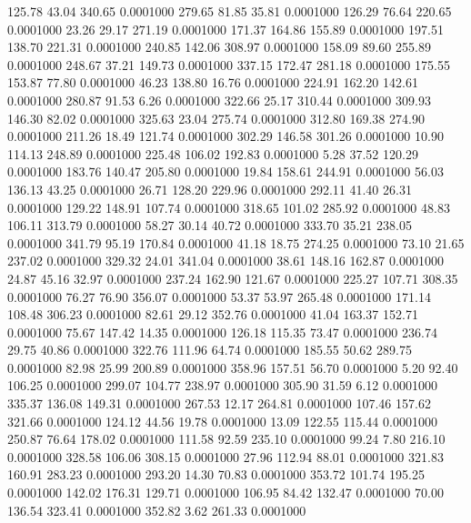  125.78   43.04  340.65   0.0001000
 279.65   81.85   35.81   0.0001000
 126.29   76.64  220.65   0.0001000
  23.26   29.17  271.19   0.0001000
 171.37  164.86  155.89   0.0001000
 197.51  138.70  221.31   0.0001000
 240.85  142.06  308.97   0.0001000
 158.09   89.60  255.89   0.0001000
 248.67   37.21  149.73   0.0001000
 337.15  172.47  281.18   0.0001000
 175.55  153.87   77.80   0.0001000
  46.23  138.80   16.76   0.0001000
 224.91  162.20  142.61   0.0001000
 280.87   91.53    6.26   0.0001000
 322.66   25.17  310.44   0.0001000
 309.93  146.30   82.02   0.0001000
 325.63   23.04  275.74   0.0001000
 312.80  169.38  274.90   0.0001000
 211.26   18.49  121.74   0.0001000
 302.29  146.58  301.26   0.0001000
  10.90  114.13  248.89   0.0001000
 225.48  106.02  192.83   0.0001000
   5.28   37.52  120.29   0.0001000
 183.76  140.47  205.80   0.0001000
  19.84  158.61  244.91   0.0001000
  56.03  136.13   43.25   0.0001000
  26.71  128.20  229.96   0.0001000
 292.11   41.40   26.31   0.0001000
 129.22  148.91  107.74   0.0001000
 318.65  101.02  285.92   0.0001000
  48.83  106.11  313.79   0.0001000
  58.27   30.14   40.72   0.0001000
 333.70   35.21  238.05   0.0001000
 341.79   95.19  170.84   0.0001000
  41.18   18.75  274.25   0.0001000
  73.10   21.65  237.02   0.0001000
 329.32   24.01  341.04   0.0001000
  38.61  148.16  162.87   0.0001000
  24.87   45.16   32.97   0.0001000
 237.24  162.90  121.67   0.0001000
 225.27  107.71  308.35   0.0001000
  76.27   76.90  356.07   0.0001000
  53.37   53.97  265.48   0.0001000
 171.14  108.48  306.23   0.0001000
  82.61   29.12  352.76   0.0001000
  41.04  163.37  152.71   0.0001000
  75.67  147.42   14.35   0.0001000
 126.18  115.35   73.47   0.0001000
 236.74   29.75   40.86   0.0001000
 322.76  111.96   64.74   0.0001000
 185.55   50.62  289.75   0.0001000
  82.98   25.99  200.89   0.0001000
 358.96  157.51   56.70   0.0001000
   5.20   92.40  106.25   0.0001000
 299.07  104.77  238.97   0.0001000
 305.90   31.59    6.12   0.0001000
 335.37  136.08  149.31   0.0001000
 267.53   12.17  264.81   0.0001000
 107.46  157.62  321.66   0.0001000
 124.12   44.56   19.78   0.0001000
  13.09  122.55  115.44   0.0001000
 250.87   76.64  178.02   0.0001000
 111.58   92.59  235.10   0.0001000
  99.24    7.80  216.10   0.0001000
 328.58  106.06  308.15   0.0001000
  27.96  112.94   88.01   0.0001000
 321.83  160.91  283.23   0.0001000
 293.20   14.30   70.83   0.0001000
 353.72  101.74  195.25   0.0001000
 142.02  176.31  129.71   0.0001000
 106.95   84.42  132.47   0.0001000
  70.00  136.54  323.41   0.0001000
 352.82    3.62  261.33   0.0001000
